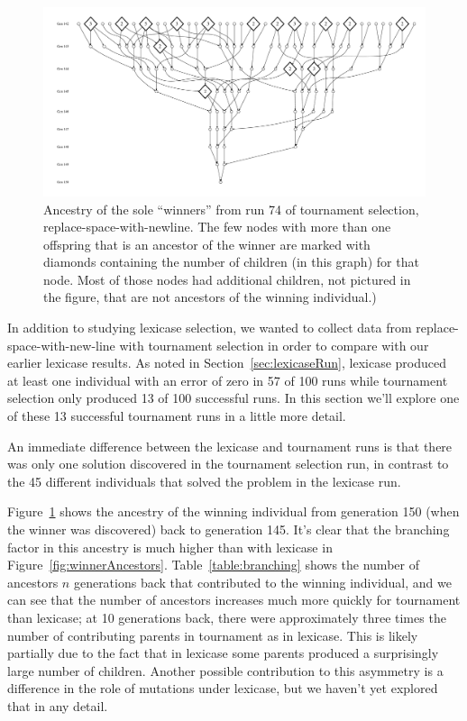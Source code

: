 \begin{figure}
	\vspace{0.6\columnwidth}
	\includegraphics[width=\columnwidth]{figures/ancestors_of_winner_rswn_tourney_run74_9gens.pdf}
	\caption{Ancestry of the sole ``winners'' from run 74 of tournament selection, 
		replace-space-with-newline. The few nodes with more than one offspring that is an ancestor of the winner
		are marked with diamonds containing the number of children (in this graph) for that node. Most of those
		nodes had additional children, not pictured in the figure, that are not ancestors of the winning individual.)}
	\label{fig:winnerAncestorsTourneyRun74}
\end{figure}

In addition to studying lexicase selection, we wanted to collect data from replace-space-with-new-line 
with tournament selection in order to compare with our earlier lexicase results. As noted in 
Section~\ref{sec:lexicaseRun}, lexicase  produced at least one individual with an error of zero in 
57 of 100 runs while tournament selection only produced 13 of 100 successful runs. In this section
we'll explore one of these 13 successful tournament runs in a little more detail.

An immediate difference between the lexicase and tournament runs is that there was only one solution
discovered in the tournament selection run, in contrast to the 45 different 
individuals that solved the problem in the lexicase run.

Figure~\ref{fig:winnerAncestorsTourneyRun74} shows the ancestry of the winning individual from 
generation 150 (when the winner was discovered) back to generation 145. It's clear that the branching
factor in this ancestry is much higher than with lexicase in Figure~\ref{fig:winnerAncestors}. 
Table~\ref{table:branching} shows 
the number of ancestors $n$ generations back that contributed to the winning individual, and we can
see that the number of ancestors increases much more quickly for tournament than lexicase; 
at 10 generations back, there were approximately three times the number of contributing parents in 
tournament as in lexicase. This is likely partially
due to the fact that in lexicase some parents produced a surprisingly large number of children.
Another possible contribution to this asymmetry is a difference in the role of
mutations under lexicase, but we haven't yet explored that in any detail.


